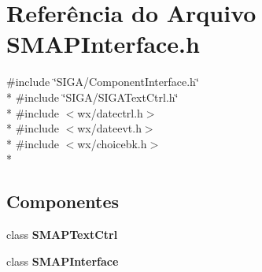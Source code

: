 \section{Referência do Arquivo S\+M\+A\+P\+Interface.\+h}
\label{_s_m_a_p_interface_8h}
{\ttfamily \#include \char`\"{}S\+I\+G\+A/\+Component\+Interface.\+h\char`\"{}}\\*
{\ttfamily \#include \char`\"{}S\+I\+G\+A/\+S\+I\+G\+A\+Text\+Ctrl.\+h\char`\"{}}\\*
{\ttfamily \#include $<$wx/datectrl.\+h$>$}\\*
{\ttfamily \#include $<$wx/dateevt.\+h$>$}\\*
{\ttfamily \#include $<$wx/choicebk.\+h$>$}\\*
\subsection*{Componentes}
\begin{DoxyCompactItemize}
\item 
class {\bf S\+M\+A\+P\+Text\+Ctrl}
\item 
class {\bf S\+M\+A\+P\+Interface}
\end{DoxyCompactItemize}
